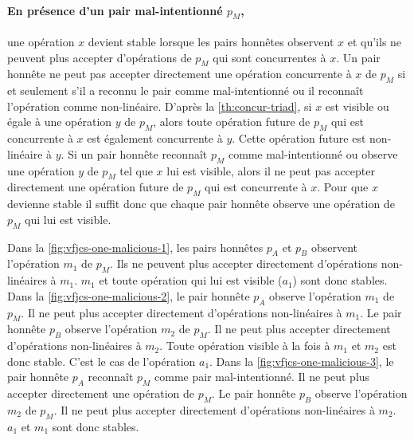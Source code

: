 \paragraph{En présence d'un pair mal-intentionné $p_M$,}
une opération $x$ devient stable lorsque les pairs honnêtes observent $x$ et qu'ils ne peuvent plus accepter d'opérations de $p_M$ qui sont concurrentes à $x$.
Un pair honnête ne peut pas accepter directement une opération concurrente à $x$ de $p_M$ si et seulement s'il a reconnu le pair comme mal-intentionné ou il reconnaît l'opération comme non-linéaire.
D'après la \autoref{th:concur-triad}, si $x$ est visible ou égale à une opération $y$ de $p_M$, alors toute opération future de $p_M$ qui est concurrente à $x$ est également concurrente à $y$.
Cette opération future est non-linéaire à $y$.
Si un pair honnête reconnaît $p_M$ comme mal-intentionné ou observe une opération $y$ de $p_M$ tel que $x$ lui est visible, alors il ne peut pas accepter directement une opération future de $p_M$ qui est concurrente à $x$.
Pour que $x$ devienne stable il suffit donc que chaque pair honnête observe une opération de $p_M$ qui lui est visible.

Dans la \autoref{fig:vfjcs-one-malicious-1}, les pairs honnêtes $p_A$ et $p_B$ observent l'opération $m_1$ de $p_M$.
Ils ne peuvent plus accepter directement d'opérations non-linéaires à $m_1$.
$m_1$ et toute opération qui lui est visible ($a_1$) sont donc stables.
Dans la \autoref{fig:vfjcs-one-malicious-2}, le pair honnête $p_A$ observe l'opération $m_1$ de $p_M$.
Il ne peut plus accepter directement d'opérations non-linéaires à $m_1$.
Le pair honnête  $p_B$ observe l'opération $m_2$ de $p_M$.
Il ne peut plus accepter directement d'opérations non-linéaires à $m_2$.
Toute opération visible à la fois à $m_1$ et $m_2$ est donc stable.
C'est le cas de l'opération $a_1$.
Dans la \autoref{fig:vfjcs-one-malicious-3}, le pair honnête $p_A$ reconnaît $p_M$ comme pair mal-intentionné.
Il ne peut plus accepter directement une opération de $p_M$.
Le pair honnête  $p_B$ observe l'opération $m_2$ de $p_M$.
Il ne peut plus accepter directement d'opérations non-linéaires à $m_2$.
$a_1$ et $m_1$ sont donc stables.


